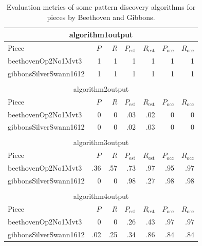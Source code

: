 \begin{table}
\caption{Evaluation metrics of some pattern discovery algorithms for pieces by Beethoven and Gibbons.}
\begin{center}
\begin{tabular}{lrrrrrr} 
\multicolumn{7}{c}{algorithm1output} \\
\hline
Piece & $P$ & $R$ & $P_\text{est}$ & $R_\text{est}$ & $P_\text{occ}$ & $R_\text{occ}$ \\
\hline
beethovenOp2No1Mvt3 & 1 & 1 & 1 & 1 & 1 & 1 \\
gibbonsSilverSwann1612 & 1 & 1 & 1 & 1 & 1 & 1 \\
\hline\\[-.3cm]
\multicolumn{7}{c}{algorithm2output} \\
\hline
Piece & $P$ & $R$ & $P_\text{est}$ & $R_\text{est}$ & $P_\text{occ}$ & $R_\text{occ}$ \\
\hline
beethovenOp2No1Mvt3 & 0 & 0 & .03 & .02 & 0 & 0 \\
gibbonsSilverSwann1612 & 0 & 0 & .02 & .03 & 0 & 0 \\
\hline
\hline\\[-.3cm]
\multicolumn{7}{c}{algorithm3output} \\
\hline
Piece & $P$ & $R$ & $P_\text{est}$ & $R_\text{est}$ & $P_\text{occ}$ & $R_\text{occ}$ \\
\hline
beethovenOp2No1Mvt3 & .36 & .57 & .73 & .97 & .95 & .97 \\
gibbonsSilverSwann1612 & 0 & 0 & .98 & .27 & .98 & .98 \\
\hline
\hline\\[-.3cm]
\multicolumn{7}{c}{algorithm4output} \\
\hline
Piece & $P$ & $R$ & $P_\text{est}$ & $R_\text{est}$ & $P_\text{occ}$ & $R_\text{occ}$ \\
\hline
beethovenOp2No1Mvt3 & 0 & 0 & .26 & .43 & .97 & .97 \\
gibbonsSilverSwann1612 & .02 & .25 & .34 & .86 & .84 & .84 \\
\hline
\hline
\end{tabular}
\end{center}
\label{tab:MIREX-eval-example}
\end{table}

